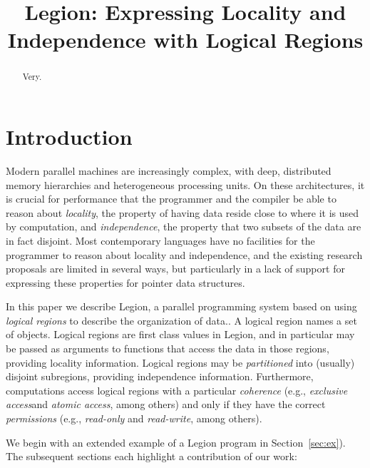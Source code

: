 \documentclass[9pt,nocopyrightspace]{sigplanconf}
\begin{document}
\title{Legion: Expressing Locality and Independence with Logical Regions}
\authorinfo{}{}{}
\maketitle

\begin{abstract}
Very.
\end{abstract}

\section{Introduction}
\label{sect:intro}
Modern parallel machines are increasingly complex, with deep,
distributed memory hierarchies and heterogeneous processing units.  On
these architectures, it is crucial for performance that the programmer
and the compiler be able to reason about {\em locality}, the property
of having data reside close to where it is used by computation, and
{\em independence}, the property that two subsets of the data are in
fact disjoint.  Most contemporary languages have no facilities for the
programmer to reason about locality and independence, and the existing
research proposals are limited in several ways, but particularly in a
lack of support for expressing these properties for pointer data structures.

In this paper we describe Legion, a parallel programming system based
on using {\em logical regions} to describe the organization of data..
A logical region names a set of objects.  Logical regions are first
class values in Legion, and in particular may be passed as arguments
to functions that access the data in those regions, providing locality
information.  Logical regions may be {\em partitioned} into (usually)
disjoint subregions, providing independence information.  Furthermore,
computations access logical regions with a particular {\em coherence}
(e.g., {\em exclusive access}and {\em atomic access}, among others)
and only if they have the correct {\em permissions} (e.g., {\em
  read-only} and {\em read-write}, among others).

We begin with an extended example of a Legion program in Section~\ref{sec:ex}).
The subsequent sections each highlight a contribution of our work:
 
\end{document}
